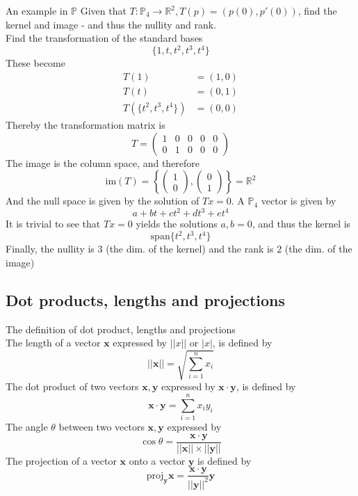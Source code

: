 \documentclass[journal, letterpaper]{IEEEtran}
\begin{document}
    \begin{myboxg}{An example in $\mathbb{P}$} \newline 
        Given that $T: \mathbb{P}_4 \to \mathbb{R}^2, T(p) = (p(0), p'(0))$, find the kernel and image - and thus the nullity and rank.
        \newline \\ 
        Find the transformation of the standard bases
        $$ \{ 1, t, t^2, t^3, t^4 \}$$
        These become
        \begin{align*}
            T(1) &= (1, 0) \\
            T(t) &= (0, 1) \\ 
            T(\{t^2, t^3, t^4\}) &= (0, 0)
        \end{align*}
        Thereby the transformation matrix is
        $$
        T = \begin{pmatrix}
            1 & 0 & 0 & 0 & 0 \\
            0 & 1 & 0 & 0 & 0
        \end{pmatrix}
        $$
        The image is the column space, and therefore
        $$ 
        \text{im}(T) = \left\{\begin{pmatrix}
        1 \\ 0
        \end{pmatrix}, \begin{pmatrix}
        0 \\ 1
        \end{pmatrix}\right\} = \mathbb{R}^2
        $$
        And the null space is given by the solution of $Tx = 0$. A $\mathbb{P}_4$ vector is given by
        $$ a + bt + ct^2 + dt^3 + et^4$$
        It is trivial to see that $Tx = 0$ yields the solutions $a, b = 0$, and thus the kernel is
        $$ \text{span}\{t^2, t^3, t^4\}$$
        Finally, the nullity is $3$ (the dim. of the kernel) and the rank is $2$ (the dim. of the image)
    \end{myboxg}
    \subsection{Dot products, lengths and projections}
    \begin{mybox}{The definition of dot product, lengths and projections} \\ 
        The length of a vector $\mathbf{x}$ expressed by $||x||$ or $|x|$, is defined by
        $$ ||\mathbf{x}|| = \sqrt{\sum_{i=1}^nx_i}$$
        The dot product of two vectors $\mathbf{x,y}$ expressed by $\mathbf{x} \cdot \mathbf{y}$, is defined by
        $$ \mathbf{x} \cdot \mathbf{y} = \sum_{i=1}^n x_iy_i$$
        The angle $\theta$ between two vectors $\mathbf{x, y}$ expressed by
        $$ \cos \theta = \frac{\mathbf{x} \cdot \mathbf{y}}{||\mathbf{x}|| \times||\mathbf{y}||}$$
        The projection of a vector $\mathbf{x}$ onto a vector $\mathbf{y}$ is defined by
        $$ \text{proj}_{\mathbf{y}}\mathbf{x} = \frac{\mathbf{x} \cdot \mathbf{y}}{||\mathbf{y}||^2}\mathbf{y}$$
    \end{mybox}
\end{document}
